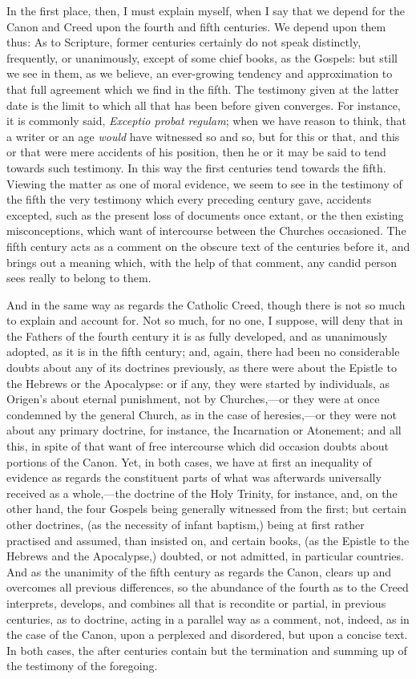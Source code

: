 In the first place, then, I must explain myself, when I say that we
depend for the Canon and Creed upon the fourth and fifth centuries. We
depend upon them thus: As to Scripture, former centuries certainly do
not speak distinctly, frequently, or unanimously, except of some chief
books, as the Gospels: but still we see in them, as we believe, an
ever-growing tendency and approximation to that full agreement which
we find in the fifth. The testimony given at the latter date is the
limit to which all that has been before given converges. For instance,
it is commonly said, \emph{Exceptio probat regulam}; when we have
reason to think, that a writer or an age \emph{would} have witnessed
so and so, but for this or that, and this or that were mere accidents
of his position, then he or it may be said to tend towards such
testimony. In this way the first centuries tend towards the fifth.
Viewing the matter as one of moral evidence, we seem to see in the
testimony of the fifth the very testimony which every preceding
century gave, accidents excepted, such as the present loss of
documents once extant, or the then existing misconceptions, which want
of intercourse between the Churches occasioned. The fifth century acts
as a comment on the obscure text of the centuries before it, and
brings out a meaning which, with the help of that comment, any candid
person sees really to belong to them.

And in the same way as regards the Catholic Creed, though
there is not so much to explain and account for. Not so much, for no
one, I suppose, will deny that in the Fathers of the fourth century it
is as fully developed, and as unanimously adopted, as it is in the
fifth century; and, again, there had been no considerable doubts about
any of its doctrines previously, as there were about the Epistle to
the Hebrews or the Apocalypse: or if any, they were started by
individuals, as Origen's about eternal punishment, not by Churches,—or
they were at once condemned by the general Church, as in the case of
heresies,—or they were not about any primary doctrine, for instance,
the Incarnation or Atonement; and all this, in spite of that want of
free intercourse which did occasion doubts about portions of the
Canon. Yet, in both cases, we have at first an inequality of evidence
as regards the constituent parts of what was afterwards universally
received as a whole,—the doctrine of the Holy Trinity, for instance,
and, on the other hand, the four Gospels being generally witnessed
from the first; but certain other doctrines, (as the necessity of
infant baptism,) being at first rather practised and assumed, than
insisted on, and certain books, (as the Epistle to the Hebrews and the
Apocalypse,) doubted, or not admitted, in particular countries. And as
the unanimity of the fifth century as regards the Canon, clears up and
overcomes all previous differences, so the abundance of the fourth as
to the Creed interprets, develops, and combines all that is recondite
or partial, in previous centuries, as to doctrine, acting in a
parallel way as a comment, not, indeed, as in the case of the Canon,
upon a perplexed and disordered, but upon a concise text. In both
cases, the after centuries contain but the termination and summing up
of the testimony of the foregoing.

